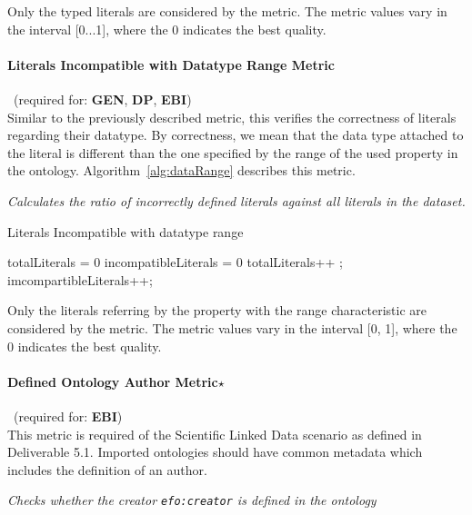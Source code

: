 Only the typed literals are considered by the metric. 
The metric values vary in the interval [0...1], where the 0 indicates the best quality.

\paragraph{Literals Incompatible with Datatype Range Metric}~(required for: \textbf{GEN}, \textbf{DP}, \textbf{EBI})~\\
Similar to the previously described metric, this verifies the correctness of literals regarding their datatype. 
By correctness, we mean that the data type attached to the literal is different than the one specified by the range of the used property in the ontology.
Algorithm~\ref{alg:dataRange} describes this metric.
\begin{mdframed}[style=metricdefinition]
\emph{Calculates the ratio of incorrectly defined literals against all literals in the dataset.}
\end{mdframed}

\begin{algorithm}
\caption{Literals Incompatible with datatype range}\label{alg:dataRange}
\begin{algorithmic}[1]
\State totalLiterals = 0
\State incompatibleLiterals = 0
\EndProcedure
{}
 totalLiterals++ ;
 imcompartibleLiterals++; 
\EndIf
\EndIf
\EndProcedure
\end{algorithmic}
\end{algorithm}

Only the literals referring by the property with the range characteristic are considered by the metric. 
The metric values vary in the interval [0, 1], where  the 0 indicates the best quality.

\paragraph{Defined Ontology Author Metric$\star$}~(required for: \textbf{EBI})~\\ 
This metric is required of the Scientific Linked Data scenario as defined in Deliverable 5.1.
Imported ontologies should have common metadata which includes the definition of an author.

\begin{mdframed}[style=metricdefinition]
\emph{Checks whether the creator \texttt{efo:creator} is defined in the ontology}
\end{mdframed}


